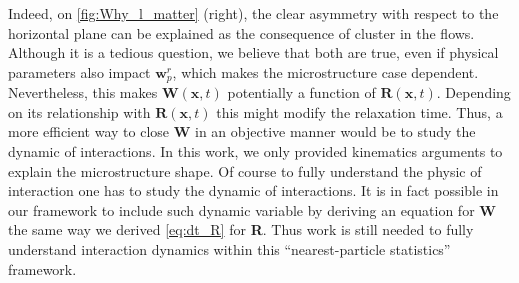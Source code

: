 Indeed, on \ref{fig:Why_l_matter} (right), the clear asymmetry with respect to the horizontal plane can be explained as the consequence of cluster  in the flows. 
Although it is a tedious question, we believe that both are true, even if physical parameters also impact $\textbf{w}_p^r$, which makes the microstructure case dependent.  
Nevertheless, this makes $\textbf{W}(\textbf{x},t)$ potentially a function of $\textbf{R}(\textbf{x},t)$.
Depending on its relationship with $\textbf{R}(\textbf{x},t)$ this might modify the relaxation time.  
Thus, a more efficient way to close \textbf{W} in an objective manner would be to study the dynamic of interactions. 
In this work, we only provided kinematics arguments to explain the microstructure shape. 
Of course to fully understand the physic of interaction one has to study the dynamic of interactions. 
It is in fact possible in our framework to include such dynamic variable by deriving an equation for \textbf{W} the same way we derived \ref{eq:dt_R} for \textbf{R}.
Thus work is still needed to fully understand interaction dynamics within this ``nearest-particle statistics'' framework. 



